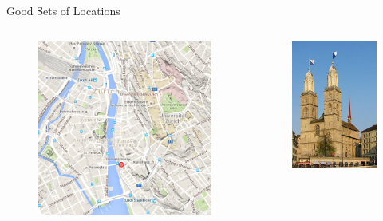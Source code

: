 \documentclass{beamer}
\begin{document}
\begin{frame}{Good Sets of Locations}
  \begin{columns}
    \begin{column}{0.5\textwidth}
      \begin{figure}
        \centering
        \includegraphics[width=\textwidth]{diversity_set_1}
      \end{figure}
    \end{column}
    \begin{column}{0.5\textwidth}
      \begin{figure}
        \centering
        \includegraphics[width=.7\textwidth]{grossmunster}

\end{figure}
\end{column}
\end{columns}
\end{frame}
\end{document}

